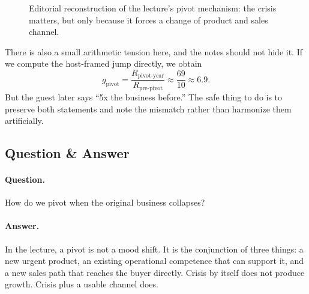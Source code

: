 \begin{figure}[h]
\centering
{}
\caption{Editorial reconstruction of the lecture's pivot mechanism: the crisis matters, but only because it forces a change of product and sales channel.}
\end{figure}

There is also a small arithmetic tension here, and the notes should not hide it. If we compute the host-framed jump directly, we obtain
\begin{equation}
g_{\text{pivot}}
=
\frac{R_{\text{pivot-year}}}{R_{\text{pre-pivot}}}
\approx
\frac{69}{10}
\approx 6.9.
\end{equation}
But the guest later says ``5x the business before.'' The safe thing to do is to preserve both statements and note the mismatch rather than harmonize them artificially.

\subsection{Question \& Answer}

\paragraph{Question.} How do we pivot when the original business collapses?

\paragraph{Answer.} In the lecture, a pivot is not a mood shift. It is the conjunction of three things: a new urgent product, an existing operational competence that can support it, and a new sales path that reaches the buyer directly. Crisis by itself does not produce growth. Crisis plus a usable channel does.

